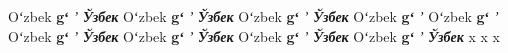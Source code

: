 \documentclass{article}
\begin{document}
\ns Oʻzbek \textbf{gʻ} \textit{ʼ} \textbf{\textit{Ўзбек}}
\nss Oʻzbek \textbf{gʻ} \textit{ʼ} \textbf{\textit{Ўзбек}}
\cmu Oʻzbek \textbf{gʻ} \textit{ʼ} \textbf{\textit{Ўзбек}}
\cmus Oʻzbek \textbf{gʻ} \textit{ʼ}
\djm Oʻzbek \textbf{gʻ} \textit{ʼ}
\djserif Oʻzbek \textbf{gʻ} \textit{ʼ} \textbf{\textit{Ўзбек}}
\djsans Oʻzbek \textbf{gʻ} \textit{ʼ} \textbf{\textit{Ўзбек}}
\inter Oʻzbek \textbf{gʻ} \textit{ʼ} \textbf{\textit{Ўзбек}}
\lato Oʻzbek \textbf{gʻ} \textit{ʼ} \textbf{\textit{Ўзбек}}
\mlm x \mpag x \mdjv x
\end{document}

